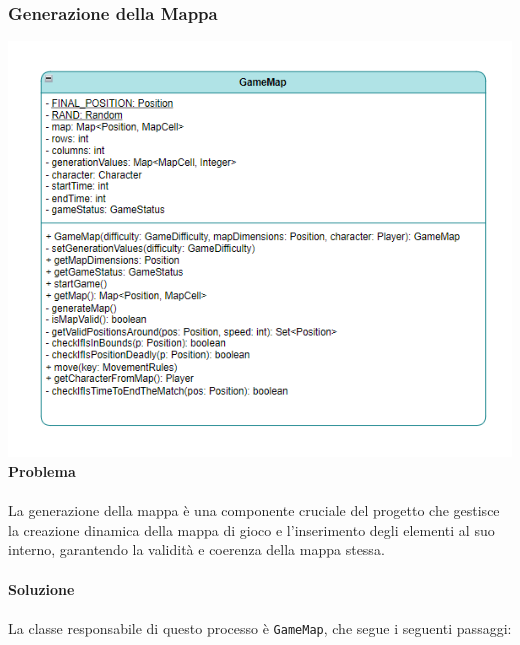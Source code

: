 \documentclass[12pt, letterpaper]{article}
\begin{document}
        \subsubsection{Generazione della Mappa}
        \includegraphics[width=\textwidth]{gamemap.png}\\
            \textbf{Problema} 
            \\ \\
            La generazione della mappa è una componente cruciale del progetto che gestisce la creazione dinamica della mappa di gioco e l'inserimento degli elementi al suo interno, garantendo la validità e coerenza della mappa stessa. 
            \\ \\
            \textbf{Soluzione} 
            \\ \\
            La classe responsabile di questo processo è \texttt{GameMap}, che segue i seguenti passaggi:
\end{document}
